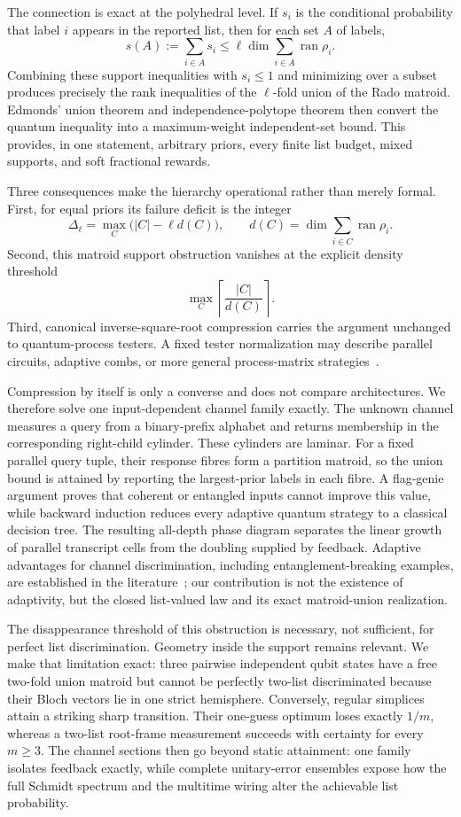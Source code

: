 \documentclass[11pt]{article}
\theoremstyle{definition}
\theoremstyle{remark}
\newcommand{\ran}{\operatorname{ran}}
\begin{document}
The connection is exact at the polyhedral level.  If $s_i$ is the conditional
probability that label $i$ appears in the reported list, then for each set
$A$ of labels,
\[
  s(A):=\sum_{i\in A}s_i
  \leq \ell\dim\sum_{i\in A}\ran\rho_i.
\]
Combining these support inequalities with $s_i\leq1$ and minimizing over a
subset produces precisely the rank inequalities of the $\ell$-fold union of
the Rado matroid.  Edmonds' union theorem and independence-polytope theorem
then convert the quantum inequality into a maximum-weight independent-set
bound.  This provides, in one statement, arbitrary priors, every finite list
budget, mixed supports, and soft fractional rewards.

Three consequences make the hierarchy operational rather than merely
formal.  First, for equal priors its failure deficit is the integer
\[
 \Delta_\ell=\max_{C}\bigl(|C|-\ell d(C)\bigr),
 \qquad d(C)=\dim\sum_{i\in C}\ran\rho_i.
\]
Second, this matroid support obstruction vanishes at the explicit density
threshold
\[
 \max_C\left\lceil\frac{|C|}{d(C)}\right\rceil.
\]
Third, canonical inverse-square-root
compression carries the argument unchanged to quantum-process testers.  A
fixed tester normalization may describe parallel circuits, adaptive combs,
or more general process-matrix strategies~\cite{chiribella2009,sedlak2016,bavaresco2022}.

Compression by itself is only a converse and does not compare architectures.
We therefore solve one input-dependent channel family exactly.  The unknown
channel measures a query from a binary-prefix alphabet and returns membership
in the corresponding right-child cylinder.  These cylinders are laminar.
For a fixed parallel query tuple, their response fibres form a partition
matroid, so the union bound is attained by reporting the largest-prior labels
in each fibre.  A flag-genie argument proves that coherent or entangled inputs
cannot improve this value, while backward induction reduces every adaptive
quantum strategy to a classical decision tree.  The resulting all-depth phase
diagram separates the linear growth of parallel transcript cells from the
doubling supplied by feedback.  Adaptive advantages for channel
discrimination, including entanglement-breaking examples, are established in
the literature~\cite{harrow2010,bavaresco2021}; our contribution is not the
existence of adaptivity, but the closed list-valued law and its exact
matroid-union realization.

The disappearance threshold of this obstruction is necessary, not sufficient, for perfect list
discrimination.  Geometry inside the support remains relevant.  We make that
limitation exact: three pairwise independent qubit states have a free
two-fold union matroid but cannot be perfectly two-list discriminated because
their Bloch vectors lie in one strict hemisphere.  Conversely, regular
simplices attain a striking sharp transition.  Their one-guess optimum loses
exactly $1/m$, whereas a two-list root-frame measurement succeeds with
certainty for every $m\geq3$.  The channel sections then go beyond static
attainment: one family isolates feedback exactly, while complete unitary-error
ensembles expose how the full Schmidt spectrum and the multitime wiring alter
the achievable list probability.
\end{document}

